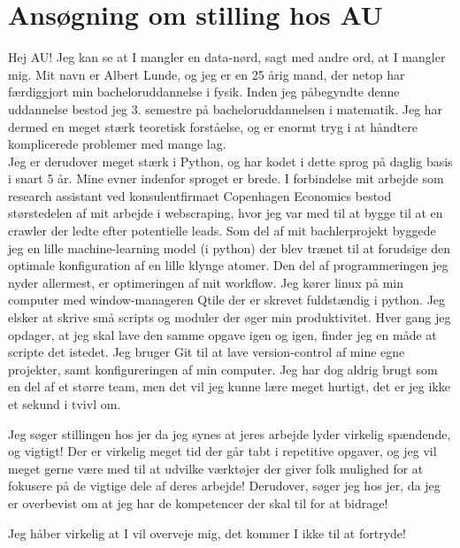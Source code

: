 \documentclass[working, oneside]{../../Preambles/tuftebook}
\begin{document}
\let\cleardoublepage\clearpage
\thispagestyle{fancy}
\chapter{Ansøgning om stilling hos AU}
Hej AU! Jeg kan se at I mangler en data-nørd, sagt med andre ord, at I mangler mig. Mit navn er Albert Lunde, og jeg er en 25 årig mand, der netop har færdiggjort min bacheloruddannelse i fysik. Inden jeg påbegyndte denne uddannelse bestod jeg 3. semestre på bacheloruddannelsen i matematik. Jeg har dermed en meget stærk teoretisk forståelse, og er enormt tryg i at håndtere komplicerede problemer med mange lag.  \\
\noindent
Jeg er derudover meget stærk i Python, og har kodet i dette sprog på daglig basis i snart 5 år. Mine evner indenfor sproget er brede. I forbindelse mit arbejde som research assistant ved konsulentfirmaet Copenhagen Economics bestod størstedelen af mit arbejde i webscraping, hvor jeg var med til at bygge til at en crawler der ledte efter potentielle leads. Som del af mit bachlerprojekt byggede jeg en lille machine-learning model (i python) der blev trænet til at forudsige den optimale konfiguration af en lille klynge atomer. Den del af programmeringen jeg nyder allermest, er optimeringen af mit workflow. Jeg kører linux på min computer med window-manageren Qtile der er skrevet fuldstændig i python. Jeg elsker at skrive små scripts og moduler der øger min produktivitet. Hver gang jeg opdager, at jeg skal lave den samme opgave igen og igen, finder jeg en måde at scripte det istedet. Jeg bruger Git til at lave version-control af mine egne projekter, samt konfigureringen af min computer. Jeg har dog aldrig brugt som en del af et større team, men det vil jeg kunne lære meget hurtigt, det er jeg ikke et sekund i tvivl om.

Jeg søger stillingen hos jer da jeg synes at jeres arbejde lyder virkelig spændende, og vigtigt! Der er virkelig meget tid der går tabt i repetitive opgaver, og jeg vil meget gerne være med til at udvilke værktøjer der giver folk mulighed for at fokusere på de vigtige dele af deres arbejde! Derudover, søger jeg hos jer, da jeg er overbevist om at jeg har de kompetencer der skal til for at bidrage!

Jeg håber virkelig at I vil overveje mig, det kommer I ikke til at fortryde! 
\end{document}
